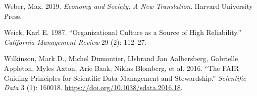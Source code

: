 \documentclass[
  a4paper,
]{book}
\newlength{\cslhangindent}
\newenvironment{CSLReferences}[2] %
 {\begin{list}{}{%
  \setlength{\itemindent}{0pt}
  \setlength{\leftmargin}{0pt}
  \setlength{\parsep}{0pt}
  \ifodd #1
   \setlength{\leftmargin}{\cslhangindent}
   \setlength{\itemindent}{-1\cslhangindent}
  \fi
  \setlength{\itemsep}{#2\baselineskip}}}
 {\end{list}}
\begin{document}
\begin{CSLReferences}{1}{0}
Weber, Max. 2019. \emph{Economy and Society: A New Translation}. Harvard
University Press.

Weick, Karl E. 1987. {``Organizational Culture as a Source of High
Reliability.''} \emph{California Management Review} 29 (2): 112--27.

Wilkinson, Mark D., Michel Dumontier, IJsbrand Jan Aalbersberg,
Gabrielle Appleton, Myles Axton, Arie Baak, Niklas Blomberg, et al.
2016. {``The FAIR Guiding Principles for Scientific Data Management and
Stewardship.''} \emph{Scientific Data} 3 (1): 160018.
\url{https://doi.org/10.1038/sdata.2016.18}.

\end{CSLReferences}


\backmatter
\end{document}
